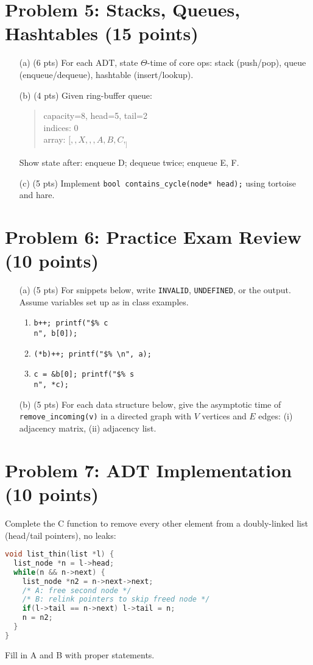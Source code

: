 \documentclass[12pt]{article}
\begin{document}
\section*{Problem 5: Stacks, Queues, Hashtables (15 points)}
\begin{enumerate}
  \item[(a)] (6 pts) For each ADT, state \(\Theta\)-time of core ops: stack (push/pop), queue (enqueue/dequeue), hashtable (insert/lookup).
  \item[(b)] (4 pts) Given ring-buffer queue:
  \begin{quote}
  capacity=8, head=5, tail=2\\
  indices: 0\\
  array: $[,,X,,,A,B,C,_]$
  \end{quote}
  Show state after: enqueue D; dequeue twice; enqueue E, F.
  \item[(c)] (5 pts) Implement \texttt{bool contains\_cycle(node* head);} using tortoise and hare.
\end{enumerate}

\section*{Problem 6: Practice Exam Review (10 points)}
\begin{enumerate}
  \item[(a)] (5 pts) For snippets below, write \texttt{INVALID}, \texttt{UNDEFINED}, or the output. Assume variables set up as in class examples.
  \begin{enumerate}
    \item \texttt{b++; printf("\$\%\ c\\n", b[0]);}
    \item \texttt{(*b)++; printf("\$\% \textbackslash n", a);}
    \item \texttt{c = \&b[0]; printf("\$\%\ s\\n", *c);}
  \end{enumerate}
  \item[(b)] (5 pts) For each data structure below, give the asymptotic time of \texttt{remove\_incoming(v)} in a directed graph with \(V\) vertices and \(E\) edges: (i) adjacency matrix, (ii) adjacency list.
\end{enumerate}

\section*{Problem 7: ADT Implementation (10 points)}
Complete the C function to remove every other element from a doubly-linked list (head/tail pointers), no leaks:
\begin{lstlisting}[language=C]
void list_thin(list *l) {
  list_node *n = l->head;
  while(n && n->next) {
    list_node *n2 = n->next->next;
    /* A: free second node */
    /* B: relink pointers to skip freed node */
    if(l->tail == n->next) l->tail = n;
    n = n2;
  }
}
\end{lstlisting}
Fill in A and B with proper statements.
\end{document}
